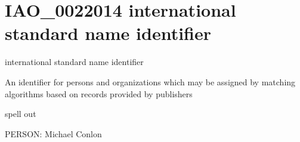 \documentclass[letterpaper,10pt,english]{sphinxmanual}
\begin{document}
\section{IAO\_0022014 \sphinxhyphen{} international standard name identifier}
\label{\detokenize{doc-IAO_0022014:iao-0022014-international-standard-name-identifier}}\label{\detokenize{doc-IAO_0022014:index-0}}\label{\detokenize{doc-IAO_0022014::doc}}
\begin{sphinxShadowBox}

\sphinxAtStartPar
international standard name identifier
\end{sphinxShadowBox}

\begin{sphinxShadowBox}

\sphinxAtStartPar
An identifier for persons and organizations which may be assigned by matching algorithms based on records provided by publishers
\end{sphinxShadowBox}

\begin{sphinxShadowBox}

\sphinxAtStartPar
{}
\end{sphinxShadowBox}

\begin{sphinxShadowBox}

\sphinxAtStartPar
spell out
\end{sphinxShadowBox}

\begin{sphinxShadowBox}

\sphinxAtStartPar
{}
\end{sphinxShadowBox}

\begin{sphinxShadowBox}

\sphinxAtStartPar
PERSON: Michael Conlon
\end{sphinxShadowBox}
\begin{quote}
\label{\detokenize{doc-IAO_0022022:iao-0022022}}\label{\detokenize{doc-IAO_0022022:research-organization-registry-identifier}}\label{\detokenize{doc-IAO_0022022:iao-0022022}}
\ignorespaces \end{quote}
\end{document}
